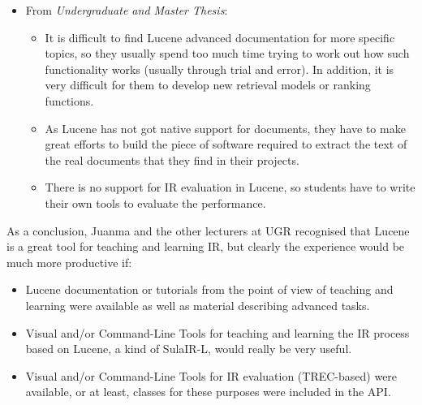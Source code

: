 \begin{itemize}
\item From {\it Undergraduate and Master Thesis}:

	\begin{itemize}
		\item It is difficult to find Lucene advanced documentation for more specific topics, so they usually spend too much time trying to work out how such functionality works (usually through trial and error). In addition,  it is very difficult for them to develop new retrieval models or ranking functions.
		\item As Lucene has not got native support for documents, they have to make great efforts to build the piece of software required to extract the text of the real documents that they find in their projects.
		\item There is no support for IR evaluation in Lucene, so students have to write their own tools to evaluate the performance.
	\end{itemize}

\end{itemize}

As a conclusion, Juanma and the other lecturers at UGR recognised that Lucene is a great tool for teaching and learning IR, but clearly the experience would be much more productive if:

\begin{itemize}
\item Lucene documentation or tutorials from the point of view of teaching and learning were available as well as material describing advanced tasks.
\item Visual and/or Command-Line Tools for teaching and learning the IR process based on Lucene, a kind of SulaIR-L, would really be very useful.
\item Visual and/or Command-Line Tools for IR evaluation (TREC-based) were available, or at least, classes for these purposes were included in the API.
\end{itemize}